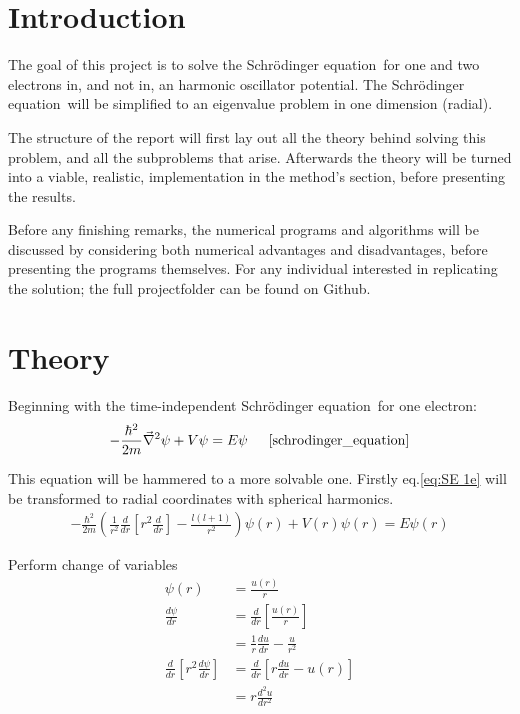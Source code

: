\documentclass[11pt,a4paper,notitlepage]{article}
\newcommand{\SE}{Schr\"odinger equation}
\newcommand{\laplacian}{\vec{\nabla}^2}
\begin{document}

\newpage
\tableofcontents

\newpage
\section{Introduction}
The goal of this project is to solve the \SE \ for one and two electrons in, and not in, an harmonic oscillator potential. The \SE \ will be simplified to an eigenvalue problem in one dimension (radial). 

The structure of the report will first lay out all the theory behind solving this problem, and all the subproblems that arise. Afterwards the theory will be turned into a viable, realistic, implementation in the method's section, before presenting the results. 

Before any finishing remarks, the numerical programs and algorithms will be discussed by considering both numerical advantages and disadvantages, before presenting the programs themselves. For any individual interested in replicating the solution; the full projectfolder can be found on Github.

\section{Theory}
Beginning with the time-independent \SE\  for one electron:
\begin{equation} \label{eq:SE 1e}
	-\frac{\hbar^2}{2m}\laplacian \psi + V\psi = E\psi 			
	\indent
	\cite[chapter 4, p.132, eq:4.8]{schrodinger_equation}
\end{equation}

This equation will be hammered to a more solvable one. Firstly eq.\eqref{eq:SE 1e} will be transformed to radial coordinates with spherical harmonics.
\begin{align*}
	-\frac{\hbar^2}{2m}\left( \frac{1}{r^2} \frac{d}{dr}\left [ r^2\frac{d}{dr}\right ] - \frac{l(l+1)}{r^2}\right) \psi(r) + V(r)\psi(r) = E\psi(r)
\end{align*}

\begin{flushright}
\begin{minipage}{0.5\linewidth}
	Perform change of variables 
	\begin{align*}
		\psi(r) &= \frac{u(r)}{r} \\
		\frac{d\psi}{dr} &= \frac{d}{dr}\left[\frac{u(r)}{r}\right] \\
		&= \frac{1}{r}\frac{du}{dr} - \frac{u}{r^2} \\
		\frac{d}{dr}\left[ r^2 \frac{d\psi}{dr} \right] 
		&= \frac{d}{dr}\left[ r\frac{du}{dr} - u(r) \right] \\
		&= r\frac{d^2u}{dr^2}
	\end{align*}
\end{minipage}
\end{flushright}
\end{document}
